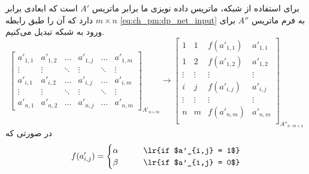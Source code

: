 برای استفاده از شبکه، ماتریس داده نویزی ما برابر ماتریس $A'$ است که ابعادی برابر $m\times n$ دارد که آن را طبق رابطه \ref{eq:ch_pm:dp_net_input} به فرم ماتریس $A''$ برای ورود به شبکه تبدیل می‌کنیم. 
\begin{equation*}
	\begin{bmatrix}
		a'_{1,1}  & a'_{1,2} & \ldots   & a'_{1,j}   & \ldots & a'_{1,m}\\
		\vdots & \vdots & \ddots & \vdots & \ddots & \vdots \\
		a'_{i,1}  & a'_{i,2} & \ldots   & a'_{i,j}   & \ldots & a'_{i,m}\\
		\vdots & \vdots & \ddots & \vdots & \ddots & \vdots \\
		a'_{n,1}  & a'_{n,2} & \ldots   & a'_{n,j}   & \ldots & a'_{n,m}
	\end{bmatrix}_{A'_{n\times m}}
	\rightarrow 
	\begin{bmatrix}
		1          & 1         & f(a'_{1,1}) & a'_{1,1} \\
		1          & 2         & f(a'_{1,2}) & a'_{1,2} \\
		\vdots & \vdots & \vdots   & \vdots \\
		i          & j           & f(a'_{i,j})  & a'_{i,j} \\
		\vdots & \vdots & \vdots   & \vdots \\
		n          & m         & f(a'_{n,m}) & a'_{n,m}\\
	\end{bmatrix}_{A''_{n\cdot m\times 4}}
	\label{eq:ch_pm:dp_net_input}
\end{equation*}
در صورتی که
\begin{equation}
	f(a'_{i,j}) = 
	\begin{cases}
		\alpha 	   \qquad & \text{\lr{if $a'_{i,j} = 1$}} \\
		\beta 		\qquad & \text{\lr{if $a'_{i,j} = 0$}}
	\end{cases}
\end{equation}







